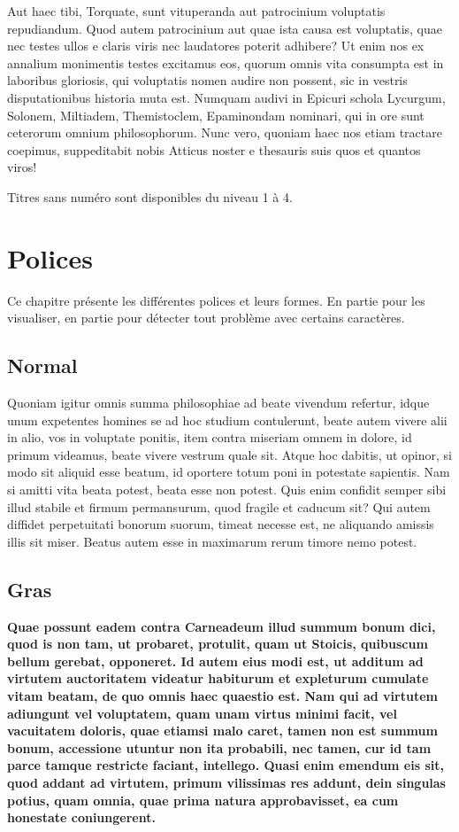\documentclass[twoside]{extreport}
\begin{document}
Aut haec tibi, Torquate, sunt vituperanda aut patrocinium voluptatis
repudiandum. Quod autem patrocinium aut quae ista causa est voluptatis,
quae nec testes ullos e claris viris nec laudatores poterit adhibere? Ut
enim nos ex annalium monimentis testes excitamus eos, quorum omnis vita
consumpta est in laboribus gloriosis, qui voluptatis nomen audire non
possent, sic in vestris disputationibus historia muta est. Numquam
audivi in Epicuri schola Lycurgum, Solonem, Miltiadem, Themistoclem,
Epaminondam nominari, qui in ore sunt ceterorum omnium philosophorum.
Nunc vero, quoniam haec nos etiam tractare coepimus, suppeditabit nobis
Atticus noster e thesauris suis quos et quantos viros!

Titres sans numéro sont disponibles du niveau 1 à 4.

\hypertarget{polices}{%
\chapter{Polices}\label{polices}}

Ce chapitre présente les différentes polices et leurs formes. En partie
pour les visualiser, en partie pour détecter tout problème avec certains
caractères.

\hypertarget{normal}{%
\section{Normal}\label{normal}}

Quoniam igitur omnis summa philosophiae ad beate vivendum refertur,
idque unum expetentes homines se ad hoc studium contulerunt, beate autem
vivere alii in alio, vos in voluptate ponitis, item contra miseriam
omnem in dolore, id primum videamus, beate vivere vestrum quale sit.
Atque hoc dabitis, ut opinor, si modo sit aliquid esse beatum, id
oportere totum poni in potestate sapientis. Nam si amitti vita beata
potest, beata esse non potest. Quis enim confidit semper sibi illud
stabile et firmum permansurum, quod fragile et caducum sit? Qui autem
diffidet perpetuitati bonorum suorum, timeat necesse est, ne aliquando
amissis illis sit miser. Beatus autem esse in maximarum rerum timore
nemo potest.

\hypertarget{gras}{%
\section{Gras}\label{gras}}

\textbf{Quae possunt eadem contra Carneadeum illud summum bonum dici,
quod is non tam, ut probaret, protulit, quam ut Stoicis, quibuscum
bellum gerebat, opponeret. Id autem eius modi est, ut additum ad
virtutem auctoritatem videatur habiturum et expleturum cumulate vitam
beatam, de quo omnis haec quaestio est. Nam qui ad virtutem adiungunt
vel voluptatem, quam unam virtus minimi facit, vel vacuitatem doloris,
quae etiamsi malo caret, tamen non est summum bonum, accessione utuntur
non ita probabili, nec tamen, cur id tam parce tamque restricte faciant,
intellego. Quasi enim emendum eis sit, quod addant ad virtutem, primum
vilissimas res addunt, dein singulas potius, quam omnia, quae prima
natura approbavisset, ea cum honestate coniungerent.}
\end{document}
